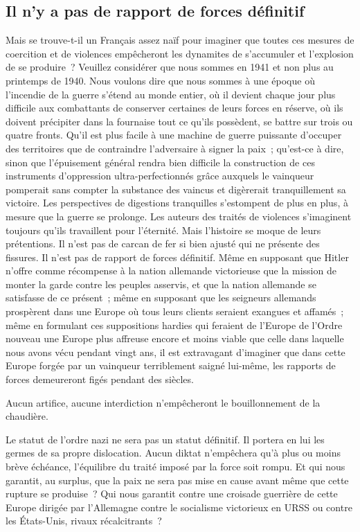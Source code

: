 \documentclass[french,twoside]{book} %
\begin{document}
\subsection[Il n’y a pas de rapport de forces définitif]{Il n’y a pas de rapport de forces définitif}
\noindent Mais se trouve-t-il un Français assez naïf pour imaginer que toutes ces mesures de coercition et de violences empêcheront les dynamites de s’accumuler et l’explosion de se produire ? Veuillez considérer que nous sommes en 1941 et non plus au printemps de 1940. Nous voulons dire que nous sommes à une époque où l’incendie de la guerre s’étend au monde entier, où il devient chaque jour plus difficile aux combattants de conserver certaines de leurs forces en réserve, où ils doivent précipiter dans la fournaise tout ce qu’ils possèdent, se battre sur trois ou quatre fronts. Qu’il est plus facile à une machine de guerre puissante d’occuper des territoires que de contraindre l’adversaire à signer la paix ; qu’est-ce à dire, sinon que l’épuisement général rendra bien difficile la construction de ces instruments d’oppression ultra-perfectionnés grâce auxquels le vainqueur pomperait sans compter la substance des vaincus et digèrerait tranquillement sa victoire. Les perspectives de digestions tranquilles s’estompent de plus en plus, à mesure que la guerre se prolonge. Les auteurs des traités de violences s’imaginent toujours qu’ils travaillent pour l’éternité. Mais l’histoire se moque de leurs prétentions. Il n’est pas de carcan de fer si bien ajusté qui ne présente des fissures. Il n’est pas de rapport de forces définitif. Même en supposant que Hitler n’offre comme récompense à la nation allemande victorieuse que la mission de monter la garde contre les peuples asservis, et que la nation allemande se satisfasse de ce présent ; même en supposant que les seigneurs allemands prospèrent dans une Europe où tous leurs clients seraient exangues et affamés ; même en formulant ces suppositions hardies qui feraient de l’Europe de l’Ordre nouveau une Europe plus affreuse encore et moins viable que celle dans laquelle nous avons vécu pendant vingt ans, il est extravagant d’imaginer que dans cette Europe forgée par un vainqueur terriblement saigné lui-même, les rapports de forces demeureront figés pendant des siècles.\par
Aucun artifice, aucune interdiction n’empêcheront le bouillonnement de la chaudière.\par
Le statut de l’ordre nazi ne sera pas un statut définitif. Il portera en lui les germes de sa propre dislocation. Aucun diktat n’empêchera qu’à plus ou moins brève échéance, l’équilibre du traité imposé par la force soit rompu. Et qui nous garantit, au surplus, que la paix ne sera pas mise en cause avant même que cette rupture se produise ? Qui nous garantit contre une croisade guerrière de cette Europe dirigée par l’Allemagne contre le socialisme victorieux en URSS ou contre les États-Unis, rivaux récalcitrants ?\par
\end{document}
